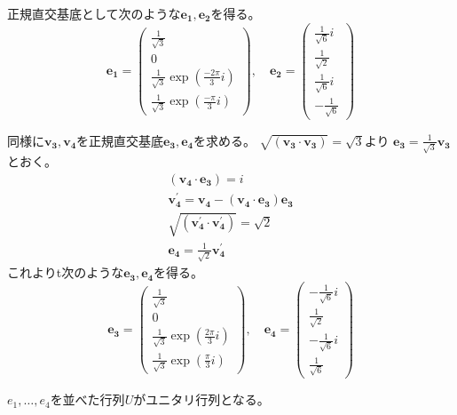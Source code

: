 \documentclass[10pt,b5paper]{ltjsarticle}
\begin{document}
正規直交基底として次のような$\bm{e_1}, \bm{e_2}$を得る。
\begin{equation}
  \bm{e_1}=
   \begin{pmatrix}
    \frac{1}{\sqrt{3}}\\
    0\\
    \frac{1}{\sqrt{3}}\exp{(\frac{-2\pi}{3}i)}\\
    \frac{1}{\sqrt{3}}\exp{(\frac{-\pi}{3}i)}
   \end{pmatrix}
   , \quad
   \bm{e_2}=
   \begin{pmatrix}
    \frac{1}{\sqrt{6}}i\\
    \frac{1}{\sqrt{2}}\\
    \frac{1}{\sqrt{6}}i\\
    -\frac{1}{\sqrt{6}}
   \end{pmatrix}
\end{equation}


同様に$\bm{v_3}, \bm{v_4}$を正規直交基底$\bm{e_3}, \bm{e_4}$を求める。
$\sqrt{(\bm{v_3}\cdot \bm{v_3})}=\sqrt{3}$より
$\bm{e_3}=\frac{1}{\sqrt{3}}\bm{v_3}$とおく。
\begin{gather}
 (\bm{v_4}\cdot \bm{e_3})=i\\
 \bm{v_4^\prime} = \bm{v_4} - (\bm{v_4}\cdot \bm{e_3})\bm{e_3}\\
 \sqrt{(\bm{v_4^\prime} \cdot \bm{v_4^\prime})}=\sqrt{2}\\
 \bm{e_4}=\frac{1}{\sqrt{2}}\bm{v_4^\prime}
\end{gather}
これよりt次のような$\bm{e_3}, \bm{e_4}$を得る。
\begin{equation}
  \bm{e_3}=
   \begin{pmatrix}
    \frac{1}{\sqrt{3}}\\
    0\\
    \frac{1}{\sqrt{3}}\exp{(\frac{2\pi}{3}i)}\\
    \frac{1}{\sqrt{3}}\exp{(\frac{\pi}{3}i)}
   \end{pmatrix}
   , \quad
  \bm{e_4}=
   \begin{pmatrix}
    -\frac{1}{\sqrt{6}}i\\
    \frac{1}{\sqrt{2}}\\
    -\frac{1}{\sqrt{6}}i\\
    \frac{1}{\sqrt{6}}
   \end{pmatrix}
\end{equation}

$e_1,\dots,e_4$を並べた行列$U$がユニタリ行列となる。
\end{document}
